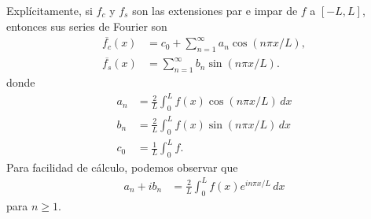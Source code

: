 \documentclass[11pt,letterpaper]{report}
\newcommand\<{\langle}
\renewcommand\>{\rangle}
\begin{document}
Explícitamente, si $f_c$ y $f_s$ son las extensiones par e impar
de $f$ a $[-L,L]$, entonces sus series de Fourier son
\begin{align*}
  \overline{f_c}(x) &= c_0 + \sum_{n=1}^{\infty}a_n\cos(n\pi x/L), \\
  \overline{f_s}(x) &= \sum_{n=1}^{\infty}b_n\sin(n\pi x/L).
\end{align*}
donde
\begin{align*}
  a_n &= \frac{2}{L}\int_{0}^L f(x)\cos(n\pi x/L)\,dx \\
  b_n &= \frac{2}{L}\int_{0}^L f(x)\sin(n\pi x/L)\,dx \\
  c_0 &= \frac{1}{L}\int_{0}^L f.
\end{align*}
Para facilidad de cálculo, podemos observar que
\begin{align*}
  a_n+ib_n
  &= \frac{2}{L}\int_0^L f(x)e^{in\pi x/L}\,dx
\end{align*}
para $n\geq 1$.
\end{document}
